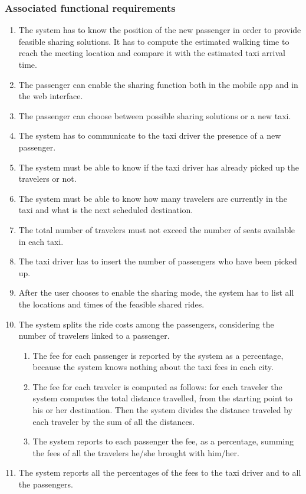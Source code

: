 \subsubsection{Associated functional requirements}
\begin{enumerate}
	\item The system has to know the position of the new passenger in order to provide feasible sharing solutions.
	It has to compute the estimated walking time to reach the meeting location and compare it with the estimated taxi arrival time.
	\item The passenger can enable the sharing function both in the mobile app and in the web interface.
	\item The passenger can choose between possible sharing solutions or a new taxi.
	\item The system has to communicate to the taxi driver the presence of a new passenger.
	\item The system must be able to know if the taxi driver has already picked up the travelers or not.
	\item The system must be able to know how many travelers are currently in the taxi and what is the next scheduled destination.
	\item The total number of travelers must not exceed the number of seats available in each taxi.
	\item The taxi driver has to insert the number of passengers who have been picked up.
	\item After the user chooses to enable the sharing mode, the system has to list all the locations and times of the feasible shared rides.
	\item The system splits the ride costs among the passengers, considering the number of travelers linked to a passenger.
	\begin{enumerate}
		\item The fee for each passenger is reported by the system as a percentage, because the system knows nothing about the taxi fees in each city.
		\item The fee for each traveler is computed as follows: for each traveler the system computes the total distance travelled, from the starting point to his or her destination. Then the system divides the distance traveled by each traveler by the sum of all the distances.
		\item The system reports to each passenger the fee, as a percentage, summing the fees of all the travelers he/she brought with him/her.
	\end{enumerate}
	\item The system reports all the percentages of the fees to the taxi driver and to all the passengers.
\end{enumerate}

